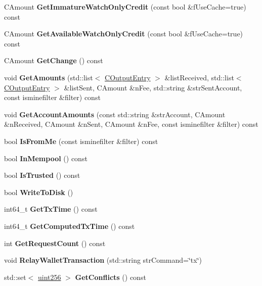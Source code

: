 \begin{DoxyCompactItemize}
C\+Amount {\bfseries Get\+Immature\+Watch\+Only\+Credit} (const bool \&f\+Use\+Cache=true) const
\item 
\mbox{\label{class_c_wallet_tx_ac78c4da3c420b2b28370cba7044dd68d}} 
C\+Amount {\bfseries Get\+Available\+Watch\+Only\+Credit} (const bool \&f\+Use\+Cache=true) const
\item 
\mbox{\label{class_c_wallet_tx_a714fe72284e4cc436d84f751a9a7aa60}} 
C\+Amount {\bfseries Get\+Change} () const
\item 
void {\bfseries Get\+Amounts} (std\+::list$<$ \mbox{\hyperlink{struct_c_output_entry}{C\+Output\+Entry}} $>$ \&list\+Received, std\+::list$<$ \mbox{\hyperlink{struct_c_output_entry}{C\+Output\+Entry}} $>$ \&list\+Sent, C\+Amount \&n\+Fee, std\+::string \&str\+Sent\+Account, const isminefilter \&filter) const
\item 
void {\bfseries Get\+Account\+Amounts} (const std\+::string \&str\+Account, C\+Amount \&n\+Received, C\+Amount \&n\+Sent, C\+Amount \&n\+Fee, const isminefilter \&filter) const
\item 
\mbox{\label{class_c_wallet_tx_a4b4fdec025af8171852c3eece1c2508f}} 
bool {\bfseries Is\+From\+Me} (const isminefilter \&filter) const
\item 
bool {\bfseries In\+Mempool} () const
\item 
\mbox{\label{class_c_wallet_tx_a71efb0d5b5def8ae00a1d74b8741bfcb}} 
bool {\bfseries Is\+Trusted} () const
\item 
bool {\bfseries Write\+To\+Disk} ()
\item 
int64\+\_\+t {\bfseries Get\+Tx\+Time} () const
\item 
int64\+\_\+t {\bfseries Get\+Computed\+Tx\+Time} () const
\item 
int {\bfseries Get\+Request\+Count} () const
\item 
void {\bfseries Relay\+Wallet\+Transaction} (std\+::string str\+Command=\char`\"{}tx\char`\"{})
\item 
std\+::set$<$ \mbox{\hyperlink{classuint256}{uint256}} $>$ {\bfseries Get\+Conflicts} () const
\end{DoxyCompactItemize}
